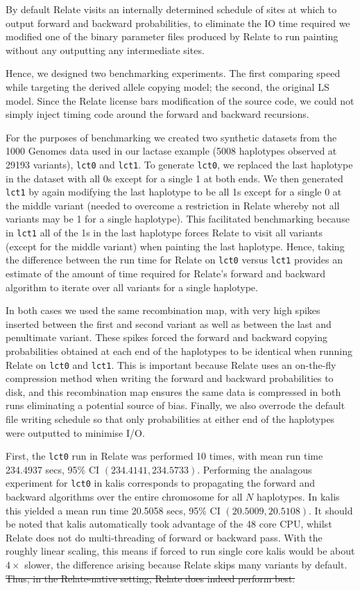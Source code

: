 \documentclass[a4paper]{article}
\newcommand{\pkg}[1]{{\fontseries{m}\fontseries{b}\selectfont #1}}
\providecommand{\DIFdel}[1]{{\protect\color{red}\sout{#1}}}                      %
\providecommand{\DIFdelbegin}{} %
\providecommand{\DIFdelend}{} %
\newcommand{\DIFscaledelfig}{0.5}
\newlength{\DIFdelgraphicswidth} %
\newlength{\DIFdelgraphicsheight} %
\newcommand{\DIFdelincludegraphics}[2][]{%
\sbox{\DIFdelgraphicsbox}{\DIFOincludegraphics[#1]{#2}}%
\settoboxwidth{\DIFdelgraphicswidth}{\DIFdelgraphicsbox} %
\settoboxtotalheight{\DIFdelgraphicsheight}{\DIFdelgraphicsbox} %
\scalebox{\DIFscaledelfig}{%
\parbox[b]{\DIFdelgraphicswidth}{\usebox{\DIFdelgraphicsbox}\\[-\baselineskip] \rule{\DIFdelgraphicswidth}{0em}}\llap{\resizebox{\DIFdelgraphicswidth}{\DIFdelgraphicsheight}{%
\setlength{\unitlength}{\DIFdelgraphicswidth}%
\begin{picture}(1,1)%
\thicklines\linethickness{2pt} %
{\color[rgb]{1,0,0}\put(0,0){\framebox(1,1){}}}%
{\color[rgb]{1,0,0}\put(0,0){\line( 1,1){1}}}%
{\color[rgb]{1,0,0}\put(0,1){\line(1,-1){1}}}%
\end{picture}%
}\hspace*{3pt}}} %
} %
\DeclareRobustCommand{\DIFdelbegin}{\DIFOdelbegin \let\includegraphics\DIFdelincludegraphics} %
\DeclareRobustCommand{\DIFdelend}{\DIFOaddend \let\includegraphics\DIFOincludegraphics} %
\begin{document}
By default Relate visits an internally determined schedule of sites at which to output forward and backward probabilities, to eliminate the IO time required we modified one of the binary parameter files produced by Relate to run painting without any outputting any intermediate sites.

Hence, we designed two benchmarking experiments.
The first comparing speed while targeting the derived allele copying model; the second, the original LS model.
Since the Relate license bars modification of the source code, we could not simply inject timing code around the forward and backward recursions.

For the purposes of benchmarking we created two synthetic datasets from the 1000 Genomes data used in our lactase example (5008 haplotypes observed at 29193 variants), \texttt{lct0} and \texttt{lct1}.
To generate \texttt{lct0}, we replaced the last haplotype in the dataset with all 0s except for a single 1 at both ends.
We then generated \texttt{lct1} by again modifying the last haplotype to be all 1s except for a single 0 at the middle variant (needed to overcome a restriction in Relate whereby not all variants may be 1 for a single haplotype).
This facilitated benchmarking because in \texttt{lct1} all of the 1s in the last haplotype forces Relate to visit all variants (except for the middle variant) when painting the last haplotype.
Hence, taking the difference between the run time for Relate on \texttt{lct0} versus \texttt{lct1} provides an estimate of the amount of time required for Relate's forward and backward algorithm to iterate over all variants for a single haplotype.

In both cases we used the same recombination map, with very high spikes inserted between the first and second variant as well as between the last and penultimate variant.
These spikes forced the forward and backward copying probabilities obtained at each end of the haplotypes to be identical when running Relate on \texttt{lct0} and \texttt{lct1}.
This is important because Relate uses an on-the-fly compression method when writing the forward and backward probabilities to disk, and this recombination map ensures the same data is compressed in both runs eliminating a potential source of bias.
Finally, we also overrode the default file writing schedule so that only probabilities at either end of the haplotypes were outputted to minimise I/O.

First, the \texttt{lct0} run in Relate was performed 10 times, with mean run time 234.4937 secs, 95\% CI $(234.4141, 234.5733)$.
Performing the analagous experiment for \texttt{lct0} in \pkg{kalis} corresponds to propagating the forward and backward algorithms over the entire chromosome for all $N$ haplotypes.
In \pkg{kalis} this yielded a mean run time 20.5058 secs, 95\% CI $(20.5009, 20.5108)$.
It should be noted that \pkg{kalis} automatically took advantage of the 48 core CPU, whilst Relate does not do multi-threading of forward or backward pass.
With the roughly linear scaling, this means if forced to run single core \pkg{kalis} would be about $4\times$ slower, the difference arising because Relate skips many variants by default.
\DIFdelbegin \DIFdel{Thus, in the Relate-native setting, Relate does indeed perform best.
}\DIFdelend 
\end{document}
